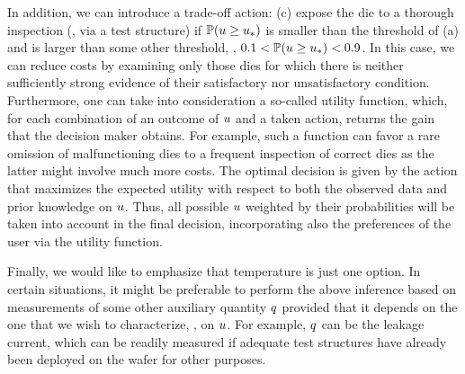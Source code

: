 In addition, we can introduce a trade-off action: (c) expose the die to a thorough inspection (\eg, via a test structure) if $\mathbb{P}(u \geq u_*)$ is smaller than the threshold of (a) and is larger than some other threshold, \eg, $0.1 < \mathbb{P}(u \geq u_*) < 0.9$. In this case, we can reduce costs by examining only those dies for which there is neither sufficiently strong evidence of their satisfactory nor unsatisfactory condition.
Furthermore, one can take into consideration a so-called utility function, which, for each combination of an outcome of $u$ and a taken action, returns the gain that the decision maker obtains.
For example, such a function can favor a rare omission of malfunctioning dies to a frequent inspection of correct dies as the latter might involve much more costs.
The optimal decision is given by the action that maximizes the expected utility with respect to both the observed data and prior knowledge on $u$.
Thus, all possible $u$ weighted by their probabilities will be taken into account in the final decision, incorporating also the preferences of the user via the utility function.

Finally, we would like to emphasize that temperature is just one option.
In certain situations, it might be preferable to perform the above inference based on measurements of some other auxiliary quantity $q$ provided that it depends on the one that we wish to characterize, \ie, on $u$.
For example, $q$ can be the leakage current, which can be readily measured if adequate test structures have already been deployed on the wafer for other purposes.
